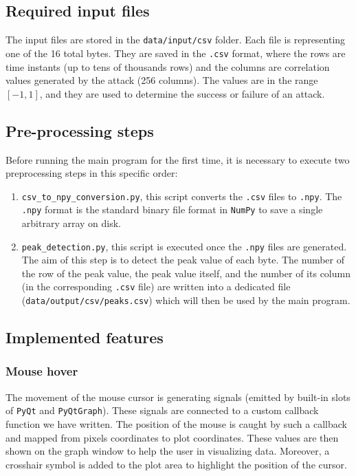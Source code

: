 \documentclass[11pt,a4paper]{article}
\begin{document}
\subsection{Required input files}
The input files are stored in the \texttt{data/input/csv} folder. Each file is representing one of the 16 total bytes. They are saved in the \texttt{.csv} format, where the rows are time instants (up to tens of thousands rows) and the columns are correlation values generated by the attack (256 columns). The values are in the range $[-1, 1]$, and they are used to determine the success or failure of an attack.

\subsection{Pre-processing steps}
Before running the main program for the first time, it is necessary to execute two preprocessing steps in this specific order:
\begin{enumerate}
    \item \texttt{csv\_to\_npy\_conversion.py}, this script converts the \texttt{.csv} files to \texttt{.npy}. The \texttt{.npy} format is the standard binary file format in \texttt{NumPy} to save a single arbitrary array on disk.
    \item \texttt{peak\_detection.py}, this script is executed once the \texttt{.npy} files are generated. The aim of this step is to detect the peak value of each byte. The number of the row of the peak value, the peak value itself, and the number of its column (in the corresponding \texttt{.csv} file) are written into a dedicated file (\texttt{data/output/csv/peaks.csv}) which will then be used by the main program.
\end{enumerate}

\subsection{Implemented features}
\subsubsection{Mouse hover}
The movement of the mouse cursor is generating signals (emitted by built-in slots of \texttt{PyQt} and \texttt{PyQtGraph}). These signals are connected to a custom callback function we have written. The position of the mouse is caught by such a callback and mapped from pixels coordinates to plot coordinates. These values are then shown on the graph window to help the user in visualizing data. Moreover, a crosshair symbol is added to the plot area to highlight the position of the cursor.
\end{document}
